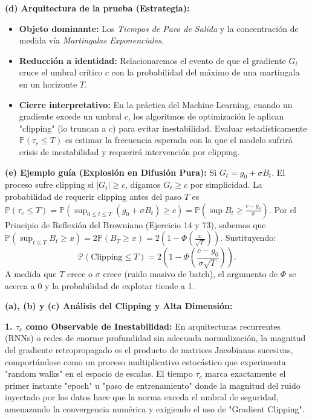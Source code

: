 \documentclass[11pt, letterpaper]{article}
\begin{document}
\begin{solucion}
    \textbf{(d) Arquitectura de la prueba (Estrategia):}
    \begin{itemize}
        \item[(i)] \textbf{Objeto dominante:} Los \textit{Tiempos de Paro de Salida} y la concentración de medida vía \textit{Martingalas Exponenciales}.
        \item[(ii)] \textbf{Reducción a identidad:} Relacionaremos el evento de que el gradiente $G_t$ cruce el umbral crítico $c$ con la probabilidad del máximo de una martingala en un horizonte $T$.
        \item[(iii)] \textbf{Cierre interpretativo:} En la práctica del Machine Learning, cuando un gradiente excede un umbral $c$, los algoritmos de optimización le aplican "clipping" (lo truncan a $c$) para evitar inestabilidad. Evaluar estadísticamente $\mathbb{P}(\tau_c \le T)$ es estimar la frecuencia esperada con la que el modelo sufrirá crisis de inestabilidad y requerirá intervención por clipping.
    \end{itemize}

    \vspace{3mm}
    \textbf{(e) Ejemplo guía (Explosión en Difusión Pura):}
    Si $G_t = g_0 + \sigma B_t$. El proceso sufre clipping si $|G_t| \ge c$, digamos $G_t \ge c$ por simplicidad.
    La probabilidad de requerir clipping antes del paso $T$ es $\mathbb{P}(\tau_c \le T) = \mathbb{P}(\sup_{0 \le t \le T} (g_0 + \sigma B_t) \ge c) = \mathbb{P}(\sup B_t \ge \frac{c - g_0}{\sigma})$.
    Por el Principio de Reflexión del Browniano (Ejercicio 14 y 73), sabemos que $\mathbb{P}(\sup_{t \le T} B_t \ge x) = 2 \mathbb{P}(B_T \ge x) = 2(1 - \Phi(\frac{x}{\sqrt{T}}))$.
    Sustituyendo:
    \[ \mathbb{P}(\text{Clipping} \le T) = 2 \left( 1 - \Phi\left( \frac{c - g_0}{\sigma \sqrt{T}} \right) \right). \]
    A medida que $T$ crece o $\sigma$ crece (ruido masivo de batch), el argumento de $\Phi$ se acerca a 0 y la probabilidad de explotar tiende a 1.

    \textbf{(a), (b) y (c) Análisis del Clipping y Alta Dimensión:}

    \textbf{1. $\tau_c$ como Observable de Inestabilidad:}
    En arquitecturas recurrentes (RNNs) o redes de enorme profundidad sin adecuada normalización, la magnitud del gradiente retropropagado es el producto de matrices Jacobianas sucesivas, comportándose como un proceso multiplicativo estocástico que experimenta "random walks" en el espacio de escalas.
    El tiempo $\tau_c$ marca exactamente el primer instante "epoch" u "paso de entrenamiento" donde la magnitud del ruido inyectado por los datos hace que la norma exceda el umbral de seguridad, amenazando la convergencia numérica y exigiendo el uso de "Gradient Clipping".


\end{solucion}
\end{document}
